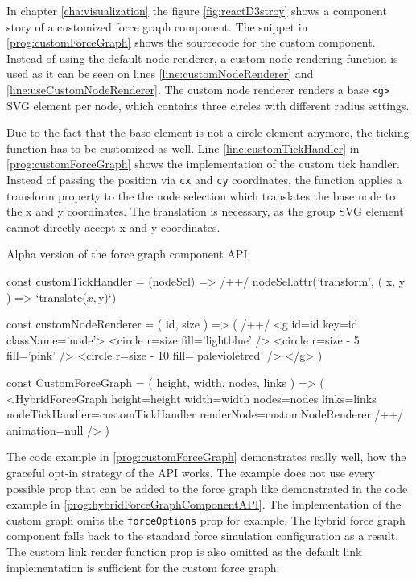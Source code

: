 In chapter \ref{cha:visualization} the figure \ref{fig:reactD3stroy} shows a component story of a customized force graph component. The snippet in \ref{prog:customForceGraph} shows the sourcecode for the custom component. Instead of using the default node renderer, a custom node rendering function is used as it can be seen on lines \ref{line:customNodeRenderer} and \ref{line:useCustomNodeRenderer}. The custom node renderer renders a base \texttt{<g>} SVG element per node, which contains three circles with different radius settings. 

Due to the fact that the base element is not a circle element anymore, the ticking function has to be customized as well. Line \ref{line:customTickHandler} in \ref{prog:customForceGraph} shows the implementation of the custom tick handler. Instead of passing the position via \texttt{cx} and \texttt{cy} coordinates, the function applies a transform property to the the node selection which translates the base node to the x and y coordinates. The translation is necessary, as the group SVG element cannot directly accept x and y coordinates.

\begin{program}
\caption{Alpha version of the force graph component API.}
\label{prog:customForceGraph}
\begin{JsCode}
const customTickHandler = (nodeSel) => /+\label{line:customTickHandler}+/ 
  nodeSel.attr('transform', ({ x, y }) => `translate(${x},${y})`)

const customNodeRenderer = ({ id, size }) => ( /+\label{line:customNodeRenderer}+/ 
  <g id={id} key={id} className={'node'}>
    <circle r={size} fill={'lightblue'} />
    <circle r={size - 5} fill={'pink'} />
    <circle r={size - 10} fill={'palevioletred'} />
  </g>
)

const CustomForceGraph = ({ height, width, nodes, links }) => (
  <HybridForceGraph
    height={height}
    width={width}
    nodes={nodes}
    links={links}
    nodeTickHandler={customTickHandler}
    renderNode={customNodeRenderer} /+\label{line:useCustomNodeRenderer}+/ 
    animation={null}
  />
)
\end{JsCode}
\end{program}

The code example in \ref{prog:customForceGraph} demonstrates really well, how the graceful opt-in strategy of the API works. The example does not use every possible prop that can be added to the force graph like demonstrated in the code example in \ref{prog:hybridForceGraphComponentAPI}. The implementation of the custom graph omits the \texttt{forceOptions} prop for example. The hybrid force graph component falls back to the standard force simulation configuration as a result. The custom link render function prop is also omitted as the default link implementation is sufficient for the custom force graph.

